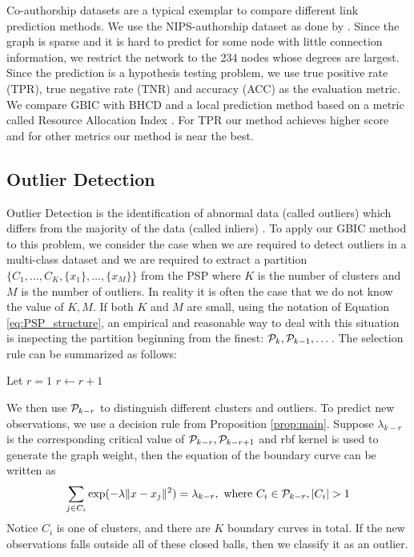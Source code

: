 Co-authorship datasets are a typical exemplar to compare different link prediction methods. We use the NIPS-authorship dataset as done by \cite{RN23}.
Since the graph is sparse and it is hard to predict for some node with little connection information, we restrict the network to the 234 nodes whose degrees are largest. Since the prediction  is a hypothesis testing problem, we use true positive rate (TPR), true negative rate (TNR) and accuracy (ACC) as the evaluation metric. We compare GBIC with BHCD and a local prediction method based on a metric called Resource Allocation Index \citep{zhou2009predicting}. For TPR our method achieves higher score
and for other metrics our method is near the best.
\begin{table}
\centering

\end{table}



\subsection{Outlier Detection}\label{subsec:od}
Outlier Detection is the identification of abnormal data (called outliers) which differs from the majority of the data (called inliers) \citep{grubbs1969procedures}.
To apply our GBIC method to this problem, we consider the case when we are required to detect outliers in a multi-class dataset and we are required to
extract a partition $\{C_1, \dots, C_K, \{x_1\}, \dots, \{x_M\}\}$ from the PSP where $K$ is the number of clusters and $M$ is the number of outliers.
In reality it is often the case that we do not know the value of $K, M$.
If both $K$ and $M$ are small, using the notation of Equation \eqref{eq:PSP_structure}, an empirical and reasonable way to deal with this situation is inspecting the partition beginning from the finest: $\P_k, \P_{k-1}, \dots$.
The selection rule can be summarized as follows:

\begin{algorithmic}
\STATE Let $r=1$
\STATE $r\leftarrow r+1$
\ENDWHILE
\end{algorithmic}

We then use $\P_{k-r}$ to distinguish different clusters and outliers. To predict new observations,  we use a decision rule from Proposition \ref{prop:main}.
Suppose $\lambda_{k-r}$ is the corresponding critical value of $\P_{k-r}, \P_{k-r+1}$ and rbf kernel is used to generate the graph weight, then the equation of
the boundary curve can be written as
\begin{equation}
\sum_{j \in C_i} \exp(-\lambda \norm{x - x_j}^2)= \lambda_{k-r}, \text{ where } C_i \in \P_{k-r},  \abs{C_i} > 1
\end{equation}
Notice $C_i$ is one of clusters, and there are $K$ boundary curves in total. If the new observations falls outside all of these closed balls, then we classify it as an outlier.

